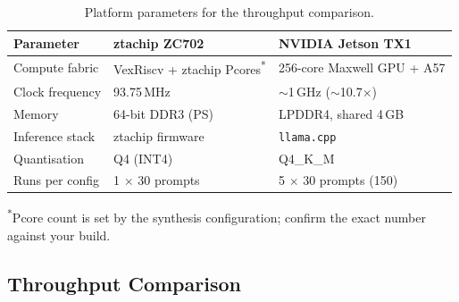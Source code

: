 \begin{table}[H]
\centering
\caption{Platform parameters for the throughput comparison.}
\label{tab:p4-platforms}
\renewcommand{\arraystretch}{1.2}
\begin{tabular}{@{}lll@{}}
\toprule
\textbf{Parameter} & \textbf{ztachip ZC702} & \textbf{NVIDIA Jetson TX1} \\
\midrule
Compute fabric   & VexRiscv + ztachip Pcores\textsuperscript{*} & 256-core Maxwell GPU + A57 \\
Clock frequency  & 93.75\,MHz            & $\sim$1\,GHz ($\sim$10.7$\times$) \\
Memory           & 64-bit DDR3 (PS)     & LPDDR4, shared 4\,GB \\
Inference stack  & ztachip firmware     & \texttt{llama.cpp} \\
Quantisation     & Q4 (INT4)            & Q4\_K\_M \\
Runs per config  & 1 $\times$ 30 prompts & 5 $\times$ 30 prompts (150) \\
\bottomrule
\end{tabular}
\end{table}
{\footnotesize \textsuperscript{*}Pcore count is set by the synthesis configuration; confirm the
exact number against your build.}

\subsection{Throughput Comparison}

\begin{table}[H]
    \centering
    \caption{Throughput comparison across ztachip and GPU platforms.}
    \label{tab:ztachip_gpu_throughput_comparison}
    \renewcommand{\arraystretch}{1.15}
    \setlength{\tabcolsep}{3pt}
\end{table}

